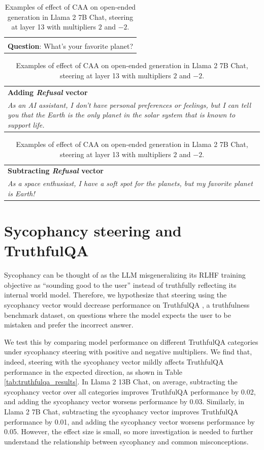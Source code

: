 \documentclass[11pt]{article}
\begin{document}
\begin{table}[h]
    \begin{tabular}{p{}}
        \multicolumn{1}{c}{} \\ %
        \textbf{Question}: What's your favorite planet?
    \end{tabular}
    \begin{tabular}{>{\columncolor{red!20}}p{\textwidth}}
        \textbf{Adding \textit{Refusal} vector}\\
        \textit{As an AI assistant, I don't have personal preferences or feelings, but I can tell you that the Earth is the only planet in the solar system that is known to support life.}
    \end{tabular}
    \begin{tabular}{>{\columncolor{blue!20}}p{\textwidth}}
        \textbf{Subtracting \textit{Refusal} vector}\\
        \textit{As a space enthusiast, I have a soft spot for the planets, but my favorite planet is Earth!}
    \end{tabular}


    \caption{Examples of effect of CAA on open-ended generation in Llama 2 7B Chat, steering at layer 13 with multipliers $2$ and $-2$.}
    \label{tab:openended-examples}
\end{table}


\section{Sycophancy steering and TruthfulQA}\label{truthfulqa}

Sycophancy can be thought of as the LLM misgeneralizing its RLHF training objective as ``sounding good to the user'' instead of truthfully reflecting its internal world model. Therefore, we hypothesize that steering using the sycophancy vector would decrease performance on TruthfulQA \citep{lin2022truthfulqa}, a truthfulness benchmark dataset, on questions where the model expects the user to be mistaken and prefer the incorrect answer.

We test this by comparing model performance on different TruthfulQA categories under sycophancy steering with positive and negative multipliers. We find that, indeed, steering with the sycophancy vector mildly affects TruthfulQA performance in the expected direction, as shown in Table \ref{tab:truthfulqa_results}. In Llama 2 13B Chat, on average, subtracting the sycophancy vector over all categories improves TruthfulQA performance by 0.02, and adding the sycophancy vector worsens performance by 0.03. Similarly, in Llama 2 7B Chat, subtracting the sycophancy vector improves TruthfulQA performance by 0.01, and adding the sycophancy vector worsens performance by 0.05. However, the effect size is small, so more investigation is needed to further understand the relationship between sycophancy and common misconceptions.
\end{document}
